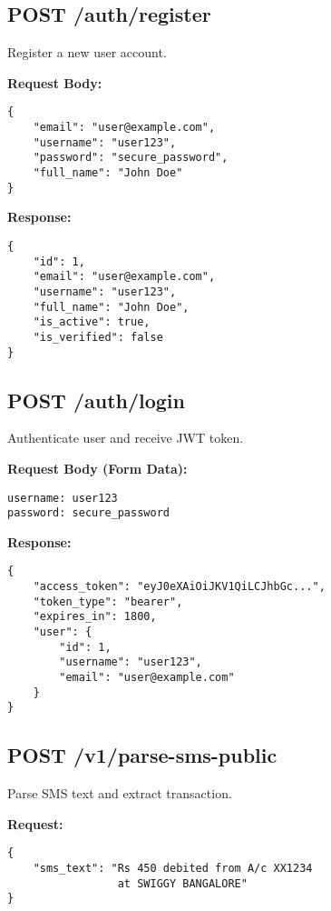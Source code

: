 \documentclass[11pt,a4paper]{report}
\begin{document}
\begin{itemize}

\subsection{POST /auth/register}
Register a new user account.

\textbf{Request Body:}
\begin{lstlisting}[]
{
    "email": "user@example.com",
    "username": "user123",
    "password": "secure_password",
    "full_name": "John Doe"
}
\end{lstlisting}

\textbf{Response:}
\begin{lstlisting}[]
{
    "id": 1,
    "email": "user@example.com",
    "username": "user123",
    "full_name": "John Doe",
    "is_active": true,
    "is_verified": false
}
\end{lstlisting}

\subsection{POST /auth/login}
Authenticate user and receive JWT token.

\textbf{Request Body (Form Data):}
\begin{lstlisting}
username: user123
password: secure_password
\end{lstlisting}

\textbf{Response:}
\begin{lstlisting}[]
{
    "access_token": "eyJ0eXAiOiJKV1QiLCJhbGc...",
    "token_type": "bearer",
    "expires_in": 1800,
    "user": {
        "id": 1,
        "username": "user123",
        "email": "user@example.com"
    }
}
\end{lstlisting}


\subsection{POST /v1/parse-sms-public}
Parse SMS text and extract transaction.

\textbf{Request:}
\begin{lstlisting}[]
{
    "sms_text": "Rs 450 debited from A/c XX1234 
                 at SWIGGY BANGALORE"
}
\end{lstlisting}


\end{itemize}
\end{document}
